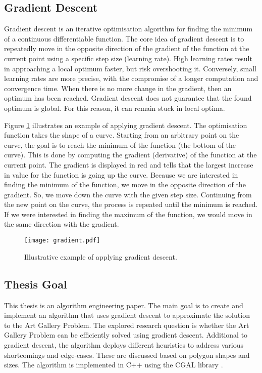 \newpage
\subsection{Gradient Descent}

Gradient descent is an iterative optimisation algorithm for finding the minimum of a continuous differentiable function. The core idea of gradient descent is to repeatedly move in the opposite direction of the gradient of the function at the current point using a specific step size (learning rate). High learning rates result in approaching a local optimum faster, but risk overshooting it. Conversely, small learning rates are more precise, with the compromise of a longer computation and convergence time.
When there is no more change in the gradient, then an optimum has been reached. Gradient descent does not guarantee that the found optimum is global. For this reason, it can remain stuck in local optima.

Figure \ref{fig:gradient_descent} illustrates an example of applying gradient descent. The optimisation function takes the shape of a curve. Starting from an arbitrary point on the curve, the goal is to reach the minimum of the function (the bottom of the curve). This is done by computing the gradient (derivative) of the function at the current point. The gradient is displayed in red and tells that the largest increase in value for the function is going up the curve. Because we are interested in finding the minimum of the function, we move in the opposite direction of the gradient. So, we move down the curve with the given step size. Continuing from the new point on the curve, the process is repeated until the minimum is reached.
If we were interested in finding the maximum of the function, we would move in the same direction with the gradient.

\begin{figure}[h!]
    \centering
    \texttt{[image: gradient.pdf]}
    \caption{Illustrative example of applying gradient descent.}
    \label{fig:gradient_descent}
\end{figure}

\subsection{Thesis Goal}
This thesis is an algorithm engineering paper. The main goal is to create and implement an algorithm that uses gradient descent to approximate the solution to the Art Gallery Problem. The explored research question is whether the Art Gallery Problem can be efficiently solved using gradient descent. Additional to gradient descent, the algorithm deploys different heuristics to address various shortcomings and edge-cases. These are discussed based on polygon shapes and sizes.
The algorithm is implemented in C++ using the CGAL library \cite{cgal}.

